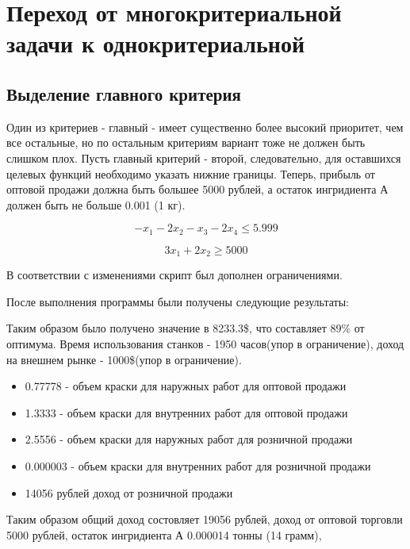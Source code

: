 \documentclass[14pt,a4paper,report]{report}
\begin{document}
\section{Переход от многокритериальной задачи к однокритериальной}
\subsection{Выделение главного критерия}


Один из критериев - главный - имеет существенно более высокий приоритет, чем все остальные, но по остальным критериям вариант тоже не должен быть слишком плох. Пусть главный критерий - второй, следовательно, для оставшихся целевых функций необходимо указать нижние границы. Теперь, прибыль от оптовой продажи должна быть большее 5000 рублей, а остаток ингридиента А должен быть не больше 0.001 (1 кг).


$$ -x_1 -2x_2-x_3-2x_4 \leq 5.999 $$ 

$$ 3x_1+2x_2 \geq 5000 $$  


В соответствии с изменениями скрипт был дополнен ограничениями.


После выполнения программы были получены следующие результаты:


Таким образом было получено значение в 8233.3\$, что составляет 89\% от оптимума. 
Время использования станков - 1950 часов(упор в ограничение), доход на внешнем рынке - 1000\$(упор в ограничение).
\begin{itemize}
\item 0.77778 - объем краски для наружных работ для оптовой продажи
\item 1.3333 - объем краски  для внутренних работ для оптовой продажи 
\item 2.5556 - объем краски  для наружных работ для розничной продажи 
\item 0.000003 - объем краски  для внутренних работ для розничной продажи 
\item 14056 рублей доход от розничной продажи
\end{itemize}

Таким образом общий доход состовляет 19056 рублей, доход от оптовой торговли 5000 рублей, остаток ингридиента А 0.000014 тонны (14 грамм),
\end{document}
